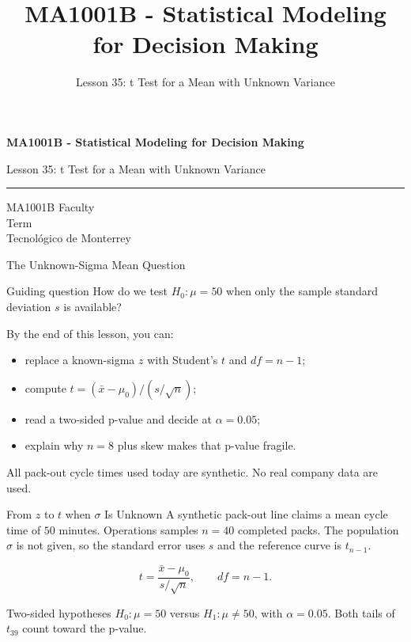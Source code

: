 \documentclass[aspectratio=169,10pt,english]{beamer}
\title{MA1001B - Statistical Modeling for Decision Making}
\subtitle{Lesson 35: t Test for a Mean with Unknown Variance}
\author{}
\institute{Tecnol\'ogico de Monterrey}
\date{}
\begin{document}
\begin{frame}[plain]
  \vspace{1.2cm}
  {\Large\bfseries MA1001B - Statistical Modeling for Decision Making\par}
  \vspace{0.7cm}
  {\large Lesson 35: t Test for a Mean with Unknown Variance\par}
  \vspace{0.7cm}
  {\color{TecRojo}\rule{\textwidth}{1.2pt}}
  \vspace{0.8cm}

  MA1001B Faculty\\[0.3cm]
  Term\\[0.3cm]
  Tecnol\'ogico de Monterrey
\end{frame}

\begin{frame}{The Unknown-Sigma Mean Question}
  \begin{alertblock}{Guiding question}
    How do we test $H_0:\mu=50$ when only the sample standard deviation $s$ is
    available?
  \end{alertblock}

  \vspace{0.6em}
  By the end of this lesson, you can:
  \begin{itemize}
    \item replace a known-sigma $z$ with Student's $t$ and $df=n-1$;
    \item compute $t=(\bar{x}-\mu_0)/(s/\sqrt{n})$;
    \item read a two-sided p-value and decide at $\alpha=0.05$;
    \item explain why $n=8$ plus skew makes that p-value fragile.
  \end{itemize}

  \vfill
  \scriptsize All pack-out cycle times used today are synthetic. No real company data are used.
\end{frame}

\begin{frame}{From $z$ to $t$ when $\sigma$ Is Unknown}
  \small
  A synthetic pack-out line claims a mean cycle time of $50$ minutes.
  Operations samples $n=40$ completed packs. The population $\sigma$ is not
  given, so the standard error uses $s$ and the reference curve is $t_{n-1}$.

  \[
    t=\frac{\bar{x}-\mu_0}{s/\sqrt{n}},\qquad df=n-1.
  \]

  \begin{exampleblock}{Two-sided hypotheses}
    $H_0:\mu=50$ versus $H_1:\mu\neq 50$, with $\alpha=0.05$. Both tails of
    $t_{39}$ count toward the p-value.
  \end{exampleblock}
\end{frame}
\end{document}
